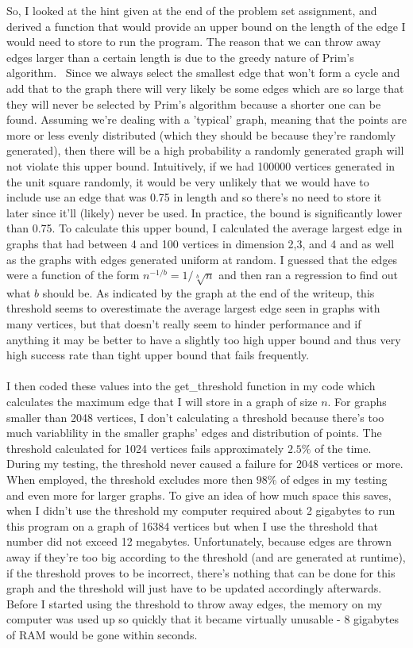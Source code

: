 \documentclass{article}
\begin{document}
So, I looked at the hint given at the end of the problem set assignment, and derived a function that would provide an upper bound on the length of the edge I would need to store to run the program.  The reason that we can throw away edges larger than a certain length is due to the greedy nature of Prim's algorithm.  Since we always select the smallest edge that won't form a cycle and add that to the graph there will very likely be some edges which are so large that they will never be selected by Prim's algorithm because a shorter one can be found. Assuming we're dealing with a 'typical' graph, meaning that the points are more or less evenly distributed (which they should be because they're randomly generated), then there will be a high probability a randomly generated graph will not violate this upper bound.  Intuitively, if we had 100000 vertices generated in the unit square randomly, it would be very unlikely that we would have to include use an edge that was 0.75 in length and so there's no need to store it later since it'll (likely) never be used.  In practice, the bound is significantly lower than 0.75.  To calculate this upper bound, I calculated the average largest edge in graphs that had between 4 and 100 vertices in dimension 2,3, and 4 and as well as the graphs with edges generated uniform at random.  I guessed that the edges were a function of the form $n^{-1/b} = 1/\sqrt[b]{n}$ and then ran a regression to find out what $b$ should be.  As indicated by the graph at the end of the writeup, this threshold seems to overestimate the average largest edge seen in graphs with many vertices, but that doesn't really seem to hinder performance and if anything it may be better to have a slightly too high upper bound and thus very high success rate than tight upper bound that fails frequently.  \\\\

I then coded these values into the get\_threshold function in my code which calculates the maximum edge that I will store in a graph of size $n$.  For graphs smaller than 2048 vertices, I don't calculating a threshold because there's too much variablility in the smaller graphs' edges and distribution of points.  The threshold calculated for 1024 vertices fails approximately $2.5\%$ of the time.  During my testing, the threshold never caused a failure for 2048 vertices or more. When employed, the threshold excludes more then $98\%$ of edges in my testing and even more for larger graphs.  To give an idea of how much space this saves, when I didn't use the threshold my computer required about 2 gigabytes to run this program on a graph of 16384 vertices but when I use the threshold that number did not exceed 12 megabytes.  Unfortunately, because edges are thrown away if they're too big according to the threshold (and are generated at runtime), if the threshold proves to be incorrect, there's nothing that can be done for this graph and the threshold will just have to be updated accordingly afterwards.  Before I started using the threshold to throw away edges, the memory on my computer was used up so quickly that it became virtually unusable - 8 gigabytes of RAM would be gone within seconds.    \\\\
\end{document}

